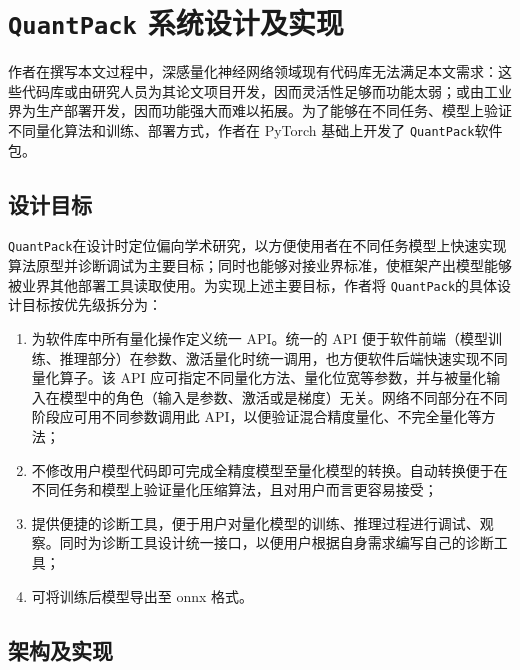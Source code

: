 \documentclass[
  fontset = mac,
]{shtthesis}
\providecommand{\QP}{\texttt{QuantPack}}
\begin{document}
\makebiblio[thesis]

\appendix
\chapter{\texttt{QuantPack} 系统设计及实现} \label{chap::quant_pack}
作者在撰写本文过程中，深感量化神经网络领域现有代码库无法满足本文需求：这些代码库或由研究人员为其论文项目开发，因而灵活性足够而功能太弱；或由工业界为生产部署开发，因而功能强大而难以拓展。为了能够在不同任务、模型上验证不同量化算法和训练、部署方式，作者在 PyTorch 基础上开发了 \QP 软件包。
\section{设计目标}
\QP 在设计时定位偏向学术研究，以方便使用者在不同任务模型上快速实现算法原型并诊断调试为主要目标；同时也能够对接业界标准，使框架产出模型能够被业界其他部署工具读取使用。为实现上述主要目标，作者将 \QP 的具体设计目标按优先级拆分为：
\begin{enumerate}
  \item 为软件库中所有量化操作定义统一 API。统一的 API 便于软件前端（模型训练、推理部分）在参数、激活量化时统一调用，也方便软件后端快速实现不同量化算子。该 API 应可指定不同量化方法、量化位宽等参数，并与被量化输入在模型中的角色（输入是参数、激活或是梯度）无关。网络不同部分在不同阶段应可用不同参数调用此 API，以便验证混合精度量化、不完全量化等方法；
  \item 不修改用户模型代码即可完成全精度模型至量化模型的转换。自动转换便于在不同任务和模型上验证量化压缩算法，且对用户而言更容易接受；
  \item 提供便捷的诊断工具，便于用户对量化模型的训练、推理过程进行调试、观察。同时为诊断工具设计统一接口，以便用户根据自身需求编写自己的诊断工具；
  \item 可将训练后模型导出至 onnx 格式。
\end{enumerate}
\section{架构及实现}
\end{document}
